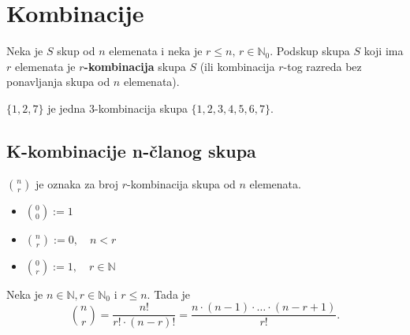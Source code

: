 \section{Kombinacije}

Neka je $S$ skup od $n$ elemenata i neka je $r\leq n,\,r\in\mathbb{N}_0$.
Podskup skupa $S$ koji ima $r$ elemenata je \textbf{$r$-kombinacija} skupa $S$
(ili kombinacija $r$-tog razreda bez ponavljanja skupa od $n$ elemenata).

\begin{example}
    $\{1,2,7\}$ je jedna 3-kombinacija skupa $\{1,2,3,4,5,6,7\}$.
\end{example}

\subsection{K-kombinacije n-članog skupa}

$\binom{n}{r}$ je oznaka za broj $r$-kombinacija skupa od $n$ elemenata.

\begin{itemize}
    \item $\displaystyle \binom{0}{0} := 1$
    \item $\displaystyle \binom{n}{r} := 0,\quad n < r$
    \item $\displaystyle \binom{0}{r} := 1,\quad r \in \mathbb{N}$
\end{itemize}

\begin{theorem}
    Neka je $n \in \mathbb{N}, r \in \mathbb{N}_0$ i $r\leq n$. Tada je
    $$
    \binom{n}{r} = \frac{n!}{r!\cdot (n-r)!} = \frac{n\cdot (n-1)\cdot \dots \cdot (n-r+1)}{r!}.
    $$
\end{theorem}
